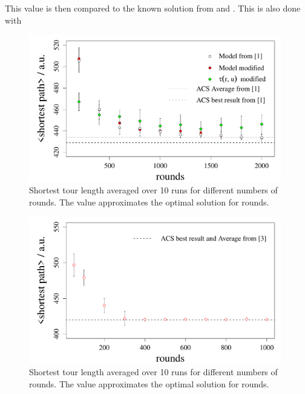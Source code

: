 This value is then compared to the known solution from \cite{web:data} and \cite{web:oli}. This is also done with 

\begin{figure}[h!]
\begin{center}
\includegraphics[width=11cm, height= 6 cm]{rounds_vs_shortestpath_eil}
\caption{Shortest tour length averaged over 10 runs for different numbers of rounds. The value approximates the optimal solution for  rounds.}
\label{fig:roundspeil}
\end{center}
\end{figure}


\begin{figure}[h!]
\begin{center}
\includegraphics[width=11cm, height= 6 cm]{rounds_vs_shortestpath_oli}
\caption{Shortest tour length averaged over 10 runs for different numbers of rounds. The value approximates the optimal solution for  rounds.}
\label{fig:roundspoli}
\end{center}
\end{figure}


